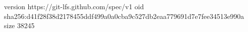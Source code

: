 version https://git-lfs.github.com/spec/v1
oid sha256:d41f28f38d2178455ddf499a0a0cba9c527db2eaa779691d7e7fee34513e990a
size 38245
